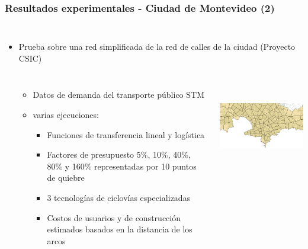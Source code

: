 \documentclass[aspectratio=43, 10pt]{beamer}
\begin{document}
\begin{frame}
    \frametitle{Resultados experimentales - Ciudad de Montevideo (2)}

    \begin{columns}[T]
        \begin{itemize}
            \item{
                Prueba sobre una red simplificada de la red de calles de la ciudad (Proyecto CSIC)
                \begin{columns}[T]
                    \begin{itemize}
                    \item{Datos de demanda del transporte público STM
                        \parencite{Massobrio2020}}
                    \item{varias ejecuciones:
                        \begin{itemize}
                            \item{Funciones de transferencia lineal y logística}
                            \item{Factores de presupuesto 5\%, 10\%, 40\%, 80\% y 160\% representadas por 10 puntos de quiebre}
                            \item{3 tecnologías de ciclovías especializadas}
                            \item{Costos de usuarios y de construcción estimados basados en la distancia de los arcos}
                        \end{itemize}
                    }
                    \end{itemize}
                    \begin{center}
                        \includegraphics[height=4cm]{images/mvd_original.png}
                    \end{center}
                \end{columns}
            }
        \end{itemize}
    \end{columns}
\end{frame}
\end{document}
